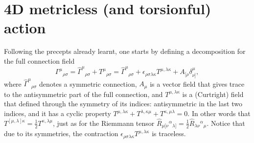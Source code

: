 \documentclass[twocolumn,
  showpacs,showkeys,prd,superscriptaddress]{revtex4-1}
\begin{document}
\section{4D metricless (and torsionful) action}

Following the precepts  already learnt, one starts  by defining a decomposition for the full connection field 
\begin{equation}
  \Gamma^\mu{}_{\rho\sigma} = \hat{\Gamma}^\mu{}_{\rho\sigma} + T^\mu{}_{\rho\sigma} = \hat{\Gamma}^\mu{}_{\rho\sigma} + \epsilon_{\rho\sigma\lambda\kappa}T^{\mu,\lambda\kappa}+A_{[\rho}\delta^\mu_{\nu]},
\end{equation}
where $\hat{\Gamma}^\mu{}_{\rho\sigma}$ denotes a symmetric connection, $A_\mu$ is a vector field  that gives trace to the antisymmetric part of the full connection, and  $T^{\mu,\lambda\kappa}$ is a (Curtright) field that  defined through the symmetry of its indices: antisymmetric in the last two indices, and it has a cyclic property $T^{\mu,\lambda\kappa}+T^{\lambda,\kappa\mu}+T^{\kappa,\mu\lambda}=0$. In other words that $T^{[\mu,\lambda]\kappa}=\frac{1}{2}T^{\kappa,\lambda\mu}$, just as for  the Riemmann tensor $\hat{R}_{\mu[\nu}{}^\alpha{}_{\lambda]}=\frac{1}{2}\hat{R}_{\lambda\nu}{}^\alpha{}_{\mu}$. Notice that due to its symmetries, the contraction $\epsilon_{\rho\sigma\lambda\kappa}T^{\mu,\lambda\kappa}$ is traceless. 
\end{document}

